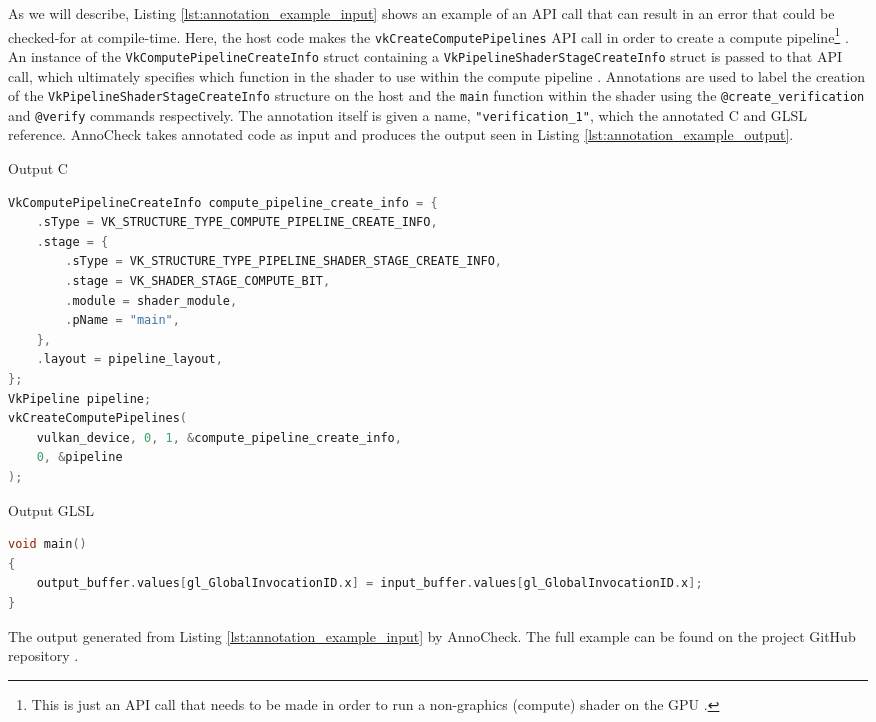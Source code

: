 \documentclass[a4paper,12pt,twoside,openright]{report}
\begin{document}
As we will describe, Listing \ref{lst:annotation_example_input} shows an
example of an API call that can result in an error that could be checked-for at
compile-time. Here, the host code makes the \texttt{vkCreateComputePipelines}
API call in order to create a compute pipeline\footnote{This is just an API
call that needs to be made in order to run a non-graphics (compute) shader on
the GPU \cite{TODO}.} \cite{vkCreateComputePipelines}. An instance of the
\texttt{VkComputePipelineCreateInfo} struct containing a
\texttt{VkPipelineShaderStageCreateInfo} struct is passed to that API call,
which ultimately specifies which function in the shader to use within the
compute pipeline \cite{VkComputePipelineCreateInfo}
\cite{VkPipelineShaderStageCreateInfo}. Annotations are used to label the
creation of the \texttt{VkPipelineShaderStageCreateInfo} structure on the host
and the \texttt{main} function within the shader using the
\texttt{@create\_verification} and \texttt{@verify} commands respectively. The
annotation itself is given a name, \texttt{"verification\_1"}, which the
annotated C and GLSL reference. AnnoCheck takes annotated code as input and
produces the output seen in Listing \ref{lst:annotation_example_output}.

\begin{lstfloat}
\begin{center} Output C \end{center}
\begin{lstlisting}[language=C]
VkComputePipelineCreateInfo compute_pipeline_create_info = {
    .sType = VK_STRUCTURE_TYPE_COMPUTE_PIPELINE_CREATE_INFO,
    .stage = {
        .sType = VK_STRUCTURE_TYPE_PIPELINE_SHADER_STAGE_CREATE_INFO,
        .stage = VK_SHADER_STAGE_COMPUTE_BIT,
        .module = shader_module,
        .pName = "main",
    },
    .layout = pipeline_layout,
};
VkPipeline pipeline;
vkCreateComputePipelines(
    vulkan_device, 0, 1, &compute_pipeline_create_info,
    0, &pipeline
);
\end{lstlisting}
\begin{center} Output GLSL \end{center}
\begin{lstlisting}[language=C]
void main()
{
    output_buffer.values[gl_GlobalInvocationID.x] = input_buffer.values[gl_GlobalInvocationID.x];
}
\end{lstlisting}
\caption{The output generated from Listing \ref{lst:annotation_example_input}
by AnnoCheck. The full example can be found on the project GitHub repository
\cite{ProjectSource}.}
\label{lst:annotation_example_output}
\end{lstfloat}
\end{document}
